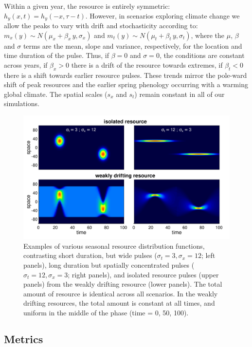 \documentclass[12pt]{article}
\begin{document}
Within a given year, the resource is entirely symmetric: $h_y(x,t) = h_y(-x, \tau-t)$. However, in scenarios exploring climate change we allow the peaks to vary with drift and stochasticity according to: $m_x(y) \sim {N}(\mu_x + \beta_x\,y, \sigma_x)$ and $m_t(y) \sim {N}(\mu_t + \beta_t\,y, \sigma_t)$, where the $\mu$, $\beta$ and $\sigma$ terms are the mean, slope and variance, respectively, for the location and time duration of the pulse. Thus, if $\beta=0$ and $\sigma=0$, the conditions are constant across years, if $\beta_x > 0$ there is a drift of the resource towards extremes, if $\beta_t < 0$ there is a shift towards earlier resource pulses. These trends mirror the pole-ward shift of peak resources and the earlier spring phenology occurring with a warming global climate. The spatial scales ($s_x$ and $s_t$) remain constant in all of our simulations. 

\begin{figure}[t!]
\includegraphics[width = \textwidth]{figures/ResourceExamples.png}

\caption{\label{fig_ResourceExamples}  Examples of various seasonal resource distribution functions, contrasting short duration, but wide pulses ($\sigma_t = 3, \sigma_x = 12$; left panels), long duration but spatially concentrated pulses ($\sigma_t = 12, \sigma_x = 3$; right panels), and isolated resource pulses (upper panels) from the weakly drifting resource (lower panels). The total amount of resource is identical across all scenarios. In the weakly drifting resources, the total amount is constant at all times, and uniform in the middle of the phase (time = 0, 50, 100).}
\end{figure}

\subsection{Metrics}
\end{document}
